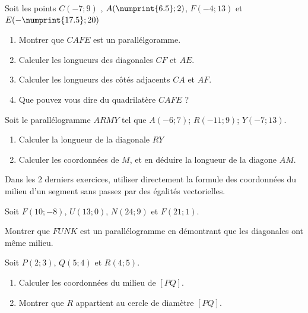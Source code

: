 \documentclass[main.tex]{subfiles}
\begin{document}
\begin{exercise}\label{chapter06:exercice:naturequadrilatere02} Soit les points $C(-7;9)$ , $A(\numprint{6.5};2)$, $F(-4;13)$ et $E(-\numprint{17.5};20)$
	\begin{enumerate}[label=\alph*), leftmargin=*]
		\item Montrer que $CAFE$ est un parallélgoramme.
		\item Calculer les longueurs des diagonales $CF$ et $AE$.
		\item Calculer les longueurs des côtés adjacents $CA$ et $AF$.
		\item  Que pouvez vous dire du quadrilatère $CAFE$ ?
	\end{enumerate}
\end{exercise} 
\begin{exercise} Soit le parallélogramme $ARMY$ tel que $A(-6;7)$; $R(-11;9)$; $Y(-7;13)$.\hfill 
	\begin{enumerate}[label=\alph*), leftmargin=*]
		\item Calculer la longueur de la diagonale $RY$  
		\item Calculer les coordonnées de $M$, et en déduire la longueur de la diagone $AM$.
	\end{enumerate}
\end{exercise} 
\begin{eBox}
	Dans les 2 derniers exercices, utiliser directement la formule des coordonnées du milieu d'un segment sans passez par des égalités vectorielles.
\end{eBox} 
\begin{exercise}  Soit $F(10;−8)$, $U(13;0)$, $N(24;9)$ et $F(21;1)$.
	
	Montrer que $FUNK$ est un parallélogramme en démontrant que les diagonales ont même milieu. 
\end{exercise}
\begin{exercise} 	Soit $P(2;3)$, $Q(5;4)$ et $R(4;5)$. 
	\begin{enumerate}[label=\alph*)]
		\item Calculer les coordonnées du milieu de $[PQ]$.
		\item Montrer que $R$ appartient au cercle de diamètre $[PQ]$.
	\end{enumerate} 
\end{exercise}  


%	 
\end{document}
